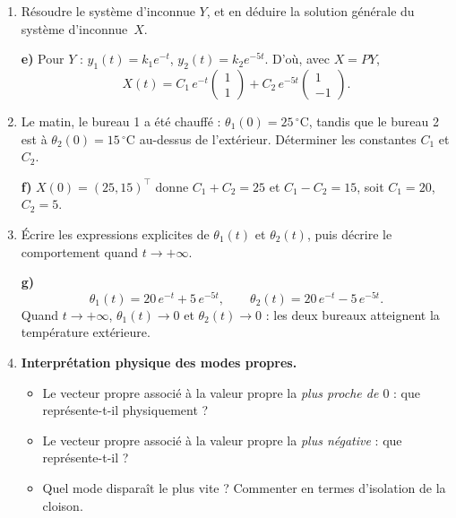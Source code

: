 \begin{enumerate}[itemsep=2em]
\begin{enumerate}[label=\alph*), itemsep=0.6em]
  \item Résoudre le système d'inconnue $Y$, et en déduire la solution générale du système d'inconnue~$X$.

\begin{solution}
\textbf{e)} Pour $Y$ : $y_1(t) = k_1 e^{-t}$, $y_2(t) = k_2 e^{-5t}$. D'où, avec $X = PY$,
\[
  X(t) = C_1\, e^{-t} \begin{pmatrix} 1 \\ 1 \end{pmatrix}
        + C_2\, e^{-5t} \begin{pmatrix} 1 \\ -1 \end{pmatrix}.
\]
\end{solution}

  \item Le matin, le bureau 1 a été chauffé : $\theta_1(0) = 25\,^{\circ}\mathrm{C}$, tandis que le bureau 2 est à $\theta_2(0) = 15\,^{\circ}\mathrm{C}$ au-dessus de l'extérieur. Déterminer les constantes $C_1$ et $C_2$.

\begin{solution}
\textbf{f)} $X(0) = (25, 15)^\top$ donne $C_1 + C_2 = 25$ et $C_1 - C_2 = 15$, soit $C_1 = 20$, $C_2 = 5$.
\end{solution}

  \item Écrire les expressions explicites de $\theta_1(t)$ et $\theta_2(t)$, puis décrire le comportement quand $t \to +\infty$.

\begin{solution}
\textbf{g)}
\[
  \theta_1(t) = 20\,e^{-t} + 5\,e^{-5t}, \qquad
  \theta_2(t) = 20\,e^{-t} - 5\,e^{-5t}.
\]
Quand $t \to +\infty$, $\theta_1(t) \to 0$ et $\theta_2(t) \to 0$ : les deux bureaux atteignent la température extérieure.
\end{solution}

  \item \textbf{Interprétation physique des modes propres.}
  \begin{itemize}[nosep]
    \item Le vecteur propre associé à la valeur propre la \emph{plus proche de $0$} : que représente-t-il physiquement ?
    \item Le vecteur propre associé à la valeur propre la \emph{plus négative} : que représente-t-il ?
    \item Quel mode disparaît le plus vite ? Commenter en termes d'isolation de la cloison.
  \end{itemize}


\end{enumerate}
\end{enumerate}
